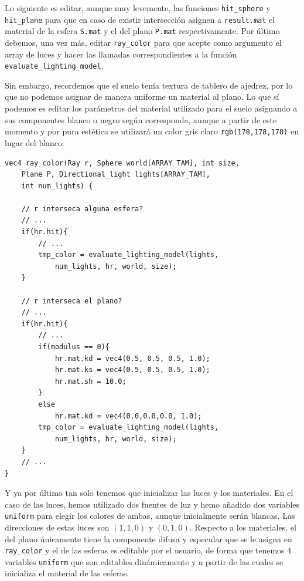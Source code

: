 Lo siguiente es editar, aunque muy levemente, las funciones \verb|hit_sphere| y \verb|hit_plane| para que en caso de existir intersección asignen a \verb|result.mat| el material de la esfera \verb|S.mat| y el del plano \verb|P.mat| respectivamente. Por último debemos, una vez más, editar \verb|ray_color| para que acepte como argumento el array de luces y hacer las llamadas correspondientes a la función \verb|evaluate_lighting_model|.

Sin embargo, recordemos que el suelo tenía textura de tablero de ajedrez, por lo que no podemos asignar de manera uniforme un material al plano. Lo que sí podemos es editar los parámetros del material utilizado para el suelo asignando a sus componentes blanco o negro según corresponda, aunque a partir de este momento y por pura estética se utilizará un color gris claro \verb|rgb(178,178,178)| en lugar del blanco.

\begin{lstlisting}
vec4 ray_color(Ray r, Sphere world[ARRAY_TAM], int size, 
    Plane P, Directional_light lights[ARRAY_TAM], 
    int num_lights) {

    // r interseca alguna esfera?
    // ...
    if(hr.hit){
        // ... 
        tmp_color = evaluate_lighting_model(lights, 
            num_lights, hr, world, size);
    }

    // r interseca el plano? 
    // ...
    if(hr.hit){
        // ... 
        if(modulus == 0){
            hr.mat.kd = vec4(0.5, 0.5, 0.5, 1.0);
            hr.mat.ks = vec4(0.5, 0.5, 0.5, 1.0);
            hr.mat.sh = 10.0;
        }
        else
            hr.mat.kd = vec4(0.0,0.0,0.0, 1.0);
        tmp_color = evaluate_lighting_model(lights, 
            num_lights, hr, world, size);
    }
    // ...
}
\end{lstlisting}

Y ya por último tan solo tenemos que inicializar las luces y los materiales. En el caso de las luces, hemos utilizado dos fuentes de luz y hemo añadido dos variables \verb|uniform| para elegir los colores de ambas, aunque inicialmente serán blancas. Las direcciones de estas luces son $(1,1,0)$ y $(0,1,0)$. Respecto a los materiales, el del plano únicamente tiene la componente difusa y especular que se le asigna en \verb|ray_color| y el de las esferas es editable por el usuario, de forma que tenemos 4 variables \verb|uniform| que son editables dinámicamente y a partir de las cuales se inicializa el material de las esferas.


